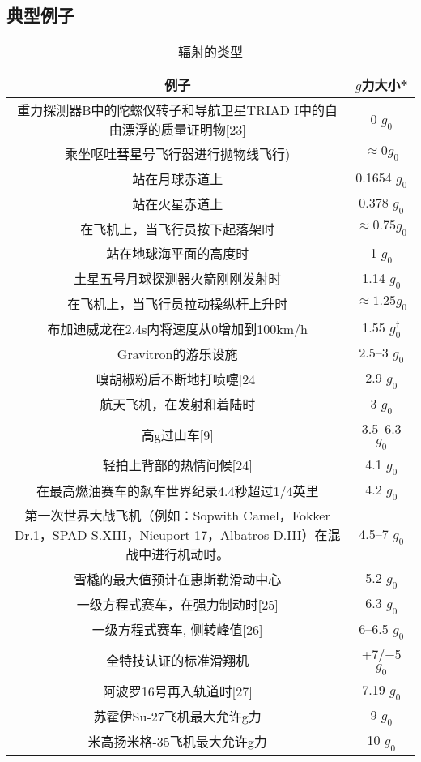 \subsection{典型例子}
\begin{table}[ht]
\centering
\caption{辐射的类型}\label{GLI}
\begin{tabular}{|c|c}
\hline
\textbf{例子} & \textbf{$g$力大小*}\\
\hline
重力探测器B中的陀螺仪转子和导航卫星TRIAD I中的自由漂浮的质量证明物[23] & 0 $g_0$\\
\hline
乘坐呕吐彗星号飞行器进行抛物线飞行) & $\approx 0 g_0$ \\
\hline
站在月球赤道上 & 0.1654 $g_0$ \\
\hline
站在火星赤道上 & 0.378 $g_0$ \\
\hline
在飞机上，当飞行员按下起落架时 & $\approx 0.75 g_0$ \\
\hline
站在地球海平面的高度时 & 1 $g_0$ \\
\hline
土星五号月球探测器火箭刚刚发射时 & 1.14 $g_0$ \\
\hline
在飞机上，当飞行员拉动操纵杆上升时 & $\approx 1.25 g_0$ \\
\hline
布加迪威龙在2.4s内将速度从0增加到100km/h & 1.55  $g_0^{\dagger}$ \\
\hline
Gravitron的游乐设施 & 2.5–3 $g_0$ \\
\hline
嗅胡椒粉后不断地打喷嚏[24] & 2.9 $g_0$ \\
\hline
航天飞机，在发射和着陆时 & 3 $g_0$ \\
\hline
高g过山车[9] & 3.5–6.3 $g_0$ \\
\hline
轻拍上背部的热情问候[24] & 4.1 $g_0$ \\
\hline
在最高燃油赛车的飙车世界纪录4.4秒超过1/4英里 & 4.2 $g_0$ \\
\hline
第一次世界大战飞机（例如：Sopwith Camel，Fokker Dr.1，SPAD S.XIII，Nieuport 17，Albatros D.III）在混战中进行机动时。 & 4.5–7 $g_0$ \\
\hline
雪橇的最大值预计在惠斯勒滑动中心 & 5.2 $g_0$ \\
\hline
一级方程式赛车，在强力制动时[25] & 6.3 $g_0$ \\
\hline
一级方程式赛车, 侧转峰值[26] & 6–6.5 $g_0$ \\
\hline
全特技认证的标准滑翔机 & +7/−5 $g_0$ \\
\hline
阿波罗16号再入轨道时[27] & 7.19 $g_0$ \\
\hline
苏霍伊Su-27飞机最大允许g力 & 9 $g_0$ \\
\hline
米高扬米格-35飞机最大允许g力 & 10 $g_0$ \\

\end{tabular}
\end{table}
